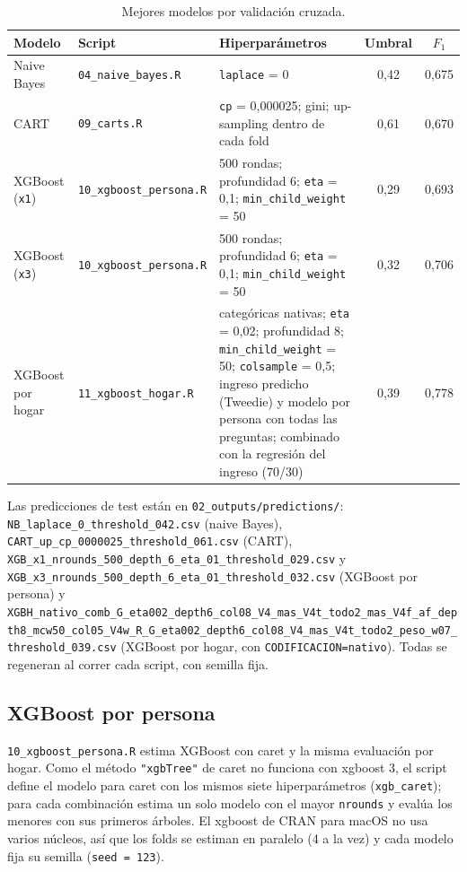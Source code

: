 \documentclass[12pt]{article}
\begin{document}
\begin{table}[H]
  \centering
  \small
  \caption{Mejores modelos por validación cruzada.}
  \label{tab:modelos}
  \begin{tabular}{@{}p{2.3cm}p{2.4cm}p{4.6cm}cc@{}}
    \toprule
    Modelo & Script & Hiperparámetros & Umbral & $F_1$ \\
    \midrule
    Naive Bayes & \texttt{04\_naive\_bayes.R} & \texttt{laplace} = 0 & 0,42 & 0,675 \\
    CART & \texttt{09\_carts.R} & \texttt{cp} = 0,000025; gini; up-sampling
      dentro de cada fold & 0,61 & 0,670 \\
    XGBoost (\texttt{x1}) & \texttt{10\_xgboost\_persona.R} & 500 rondas; profundidad 6;
      \texttt{eta} = 0,1; \texttt{min\_child\_weight} = 50 & 0,29 & 0,693 \\
    XGBoost (\texttt{x3}) & \texttt{10\_xgboost\_persona.R} & 500 rondas; profundidad 6;
      \texttt{eta} = 0,1; \texttt{min\_child\_weight} = 50 & 0,32 & 0,706 \\
    XGBoost por hogar & \texttt{11\_xgboost\_hogar.R} & categóricas nativas; \texttt{eta} = 0,02;
      profundidad 8; \texttt{min\_child\_weight} = 50; \texttt{colsample} = 0,5;
      ingreso predicho (Tweedie) y modelo por persona con todas las preguntas;
      combinado con la regresión del ingreso (70/30) & 0,39 & 0,778 \\
    \bottomrule
  \end{tabular}
\end{table}

Las predicciones de test están en \texttt{02_outputs/predictions/}:
\texttt{NB\_laplace\_0\_threshold\_042.csv} (naive Bayes),
\texttt{CART\_up\_cp\_0000025\_threshold\_061.csv} (CART),
\texttt{XGB\_x1\_nrounds\_500\_depth\_6\_eta\_01\_threshold\_029.csv} y
\texttt{XGB\_x3\_nrounds\_500\_depth\_6\_eta\_01\_threshold\_032.csv}
(XGBoost por persona) y \texttt{XGBH\_nativo\_comb\_G\_eta002\_depth6\_col08\_V4\_mas\_V4t\_todo2\_mas\_V4f\_af\_depth8\_mcw50\_col05\_V4w\_R\_G\_eta002\_depth6\_col08\_V4\_mas\_V4t\_todo2\_peso\_w07\_threshold\_039.csv}
(XGBoost por hogar, con \verb|CODIFICACION=nativo|). Todas se regeneran al correr cada script, con semilla fija.

\subsection{XGBoost por persona}
\label{sec:xgboost}

\texttt{10\_xgboost\_persona.R} estima XGBoost con caret y la misma evaluación por
hogar. Como el método \texttt{"xgbTree"} de caret no funciona con xgboost 3,
el script define el modelo para caret con los mismos siete hiperparámetros
(\texttt{xgb\_caret}); para cada combinación estima un solo modelo con el
mayor \texttt{nrounds} y evalúa los menores con sus primeros árboles. El
xgboost de CRAN para macOS no usa varios núcleos, así que los folds se estiman
en paralelo (4 a la vez) y cada modelo fija su semilla (\texttt{seed = 123}).
\end{document}
